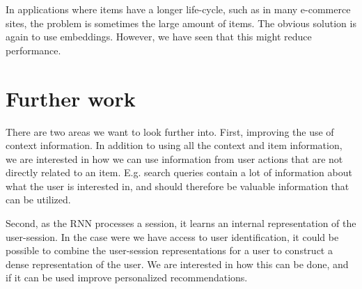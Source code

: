 In applications where items have a longer life-cycle, such as in many e-commerce sites, the problem is sometimes the large amount of items. The obvious solution is again to use embeddings. However, we have seen that this might reduce performance. 
 

\section{Further work}
There are two areas we want to look further into. First, improving the use of context information. In addition to using all the context and item information, we are interested in how we can use information from user actions that are not directly related to an item. E.g. search queries contain a lot of information about what the user is interested in, and should therefore be valuable information that can be utilized. 

Second, as the RNN processes a session, it learns an internal representation of the user-session. In the case were we have access to user identification, it could be possible to combine the user-session representations for a user to construct a dense representation of the user. We are interested in how this can be done, and if it can be used improve personalized recommendations.



